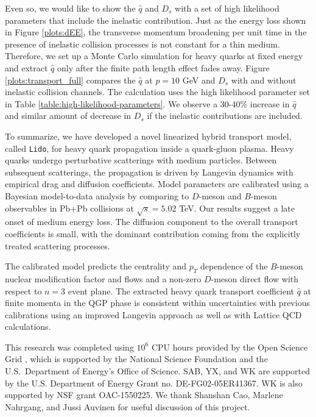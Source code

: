\documentclass[aps, prc, reprint, amsmath, groupedaddress, nofootinbib]{revtex4-1}
\begin{document}
Even so, we would like to show the $\hat{q}$ and $D_s$ with a set of high likelihood parameters that include the inelastic contribution.
Just as the energy loss shown in Figure \ref{plots:dEE}, the transverse momentum broadening per unit time in the presence of inelastic collision processes is not constant for a thin medium.
Therefore, we set up a Monte Carlo simulation for heavy quarks at fixed energy  and extract $\hat{q}$ only after the finite path length effect fades away. 
Figure \ref{plots:transport_full} compares the $\hat{q}$ at $p=10$ GeV and $D_s$ with and without inelastic collision channels.
The calculation uses the high likelihood parameter set in Table \ref{table:high-likelihood-parameters}. 
We observe a 30-40\% increase in $\hat{q}$ and similar amount of decrease in $D_s$ if the inelastic contributions are included.

To summarize, we have developed a novel linearized hybrid transport model, called {\tt Lido}, for heavy quark propagation inside a quark-gluon plasma.
Heavy quarks undergo perturbative scatterings with medium particles. Between subsequent scatterings, the propagation is driven by Langevin dynamics with empirical drag and diffusion coefficients.
Model parameters are calibrated using a Bayesian model-to-data analysis by comparing to $D$-meson and $B$-meson observables in Pb+Pb collisions at $\sqrt{s}=5.02$ TeV.
Our results suggest a late onset of medium energy loss.
The diffusion component to the overall transport coefficients is small, with the dominant contribution coming from the explicitly treated scattering processes.

The calibrated model predicts the centrality and $p_T$ dependence of the $B$-meson nuclear modification factor and flows and a non-zero $D$-meson direct flow with respect to $n=3$ event plane.
The extracted heavy quark transport coefficient $\hat{q}$ at finite momenta in the QGP phase is consistent within uncertainties with previous calibrations using an improved Langevin approach as well as with Lattice QCD calculations.


\begin{acknowledgments}
  This research was completed using $10^6$ CPU hours provided by the Open Science Grid \cite{Pordes:2007zzb,Sfiligoi:2010zz}, which is supported by the National Science Foundation and the U.S.\ Department of Energy's Office of Science.
SAB, YX, and WK  are supported by the U.S. Department of Energy Grant no. DE-FG02-05ER41367.
 WK is also supported by NSF grant OAC-1550225.
We thank Shanshan Cao, Marlene Nahrgang, and Jussi Auvinen for useful discussion of this project.
\end{acknowledgments}
\end{document}
